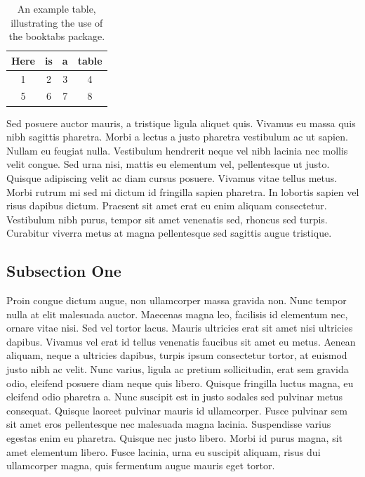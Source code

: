\begin{table}
\centering
\caption{An example table, illustrating the use of the booktabs package.}
\begin{tabular}{cccc}
\toprule
Here & is & a & table \\
\midrule
1 & 2 & 3 & 4 \\
5 & 6 & 7 & 8 \\
\bottomrule
\end{tabular}
\label{tab:example}
\end{table}

Sed posuere auctor mauris, a tristique ligula aliquet quis. Vivamus eu massa quis nibh sagittis pharetra. Morbi a lectus a justo pharetra vestibulum ac ut sapien. Nullam eu feugiat nulla. Vestibulum hendrerit neque vel nibh lacinia nec mollis velit congue. Sed urna nisi, mattis eu elementum vel, pellentesque ut justo. Quisque adipiscing velit ac diam cursus posuere. Vivamus vitae tellus metus. Morbi rutrum mi sed mi dictum id fringilla sapien pharetra. In lobortis sapien vel risus dapibus dictum. Praesent sit amet erat eu enim aliquam consectetur. Vestibulum nibh purus, tempor sit amet venenatis sed, rhoncus sed turpis. Curabitur viverra metus at magna pellentesque sed sagittis augue tristique.

\subsection{Subsection One}

Proin congue dictum augue, non ullamcorper massa gravida non. Nunc tempor nulla at elit malesuada auctor. Maecenas magna leo, facilisis id elementum nec, ornare vitae nisi. Sed vel tortor lacus. Mauris ultricies erat sit amet nisi ultricies dapibus. Vivamus vel erat id tellus venenatis faucibus sit amet eu metus. Aenean aliquam, neque a ultricies dapibus, turpis ipsum consectetur tortor, at euismod justo nibh ac velit. Nunc varius, ligula ac pretium sollicitudin, erat sem gravida odio, eleifend posuere diam neque quis libero. Quisque fringilla luctus magna, eu eleifend odio pharetra a. Nunc suscipit est in justo sodales sed pulvinar metus consequat. Quisque laoreet pulvinar mauris id ullamcorper. Fusce pulvinar sem sit amet eros pellentesque nec malesuada magna lacinia. Suspendisse varius egestas enim eu pharetra. Quisque nec justo libero. Morbi id purus magna, sit amet elementum libero. Fusce lacinia, urna eu suscipit aliquam, risus dui ullamcorper magna, quis fermentum augue mauris eget tortor.


